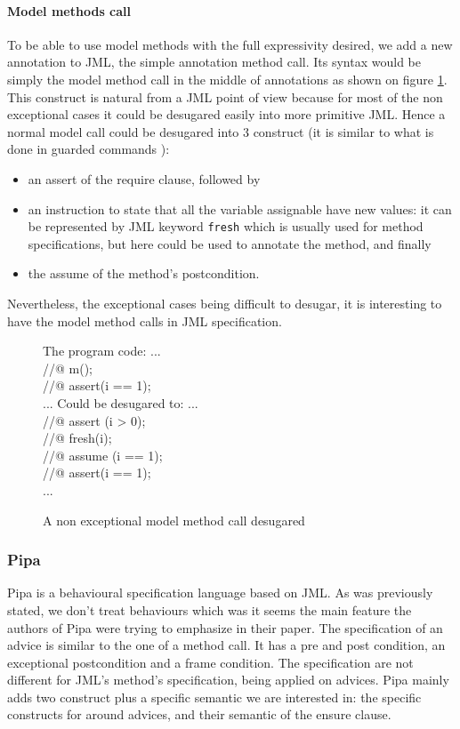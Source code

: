 \paragraph{Model methods call}
To be able to use model methods with the full expressivity desired, we add a new annotation to JML, the simple 
annotation method call. Its syntax would be simply the model method call in the middle of annotations as shown 
on figure \ref{model_meth}. This construct is natural from a JML point of view because for most of the non 
exceptional cases  it could be desugared easily into 
more primitive JML. Hence a normal model call could be desugared into 3 construct (it is similar to what is done
in guarded commands \cite{BarnettL05}):
\begin{itemize} 
\item an assert of the require clause, followed by 
\item an  instruction to state that all the variable assignable have new values: it can be represented by JML 
keyword {\tt fresh} which is usually used for method specifications, but here could be used to annotate the method, 
and finally 
\item the assume of the method's postcondition.
\end{itemize}
Nevertheless, the exceptional cases being difficult to desugar, it is interesting to have the model method calls in
JML specification.

\begin{figure}
\begin{center}\begin{minipage}{4cm}
The program code:
\bcode
...\\
//@ m();\\
//@ assert(i == 1);\\
...
\ecode
Could be desugared to:
\bcode
...\\
//@ assert (i > 0);\\
//@ fresh(i);\\
//@ assume (i == 1);\\
//@ assert(i == 1);\\
...
\ecode
\end{minipage}\end{center}
\caption{A non exceptional model method call desugared}
\label{model_meth}
\end{figure}
\subsubsection{Pipa}
Pipa is a behavioural specification language based on JML. As was previously stated, we don't treat behaviours 
which was it seems the main feature the authors of Pipa were trying to emphasize in their paper.
The specification of an advice is similar to the one of a method call. It has a pre and post condition,
an exceptional postcondition and a frame condition. The specification are not different for JML's method's 
specification, being applied on advices.
Pipa mainly adds two construct plus a specific semantic we are interested in:
the specific constructs for around advices, and their semantic of the ensure clause.

